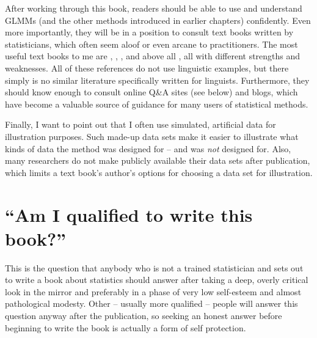 After working through this book, readers should be able to use and understand GLMMs (and the other methods introduced in earlier chapters) confidently.
Even more importantly, they will be in a position to consult text books written by statisticians, which often seem aloof or even arcane to practitioners.
The most useful text books to me are \cite{FahrmeirEa2013}, \cite{Fox2016}, \cite{ZuurEa2009}, and above all \cite{GelmanHill2006}, all with different strengths and weaknesses.
All of these references do not use linguistic examples, but there simply is no similar literature specifically written for linguists.
Furthermore, they should know enough to consult online Q\&A sites (see below) and blogs, which have become a valuable source of guidance for many users of statistical methods.

Finally, I want to point out that I often use simulated, artificial data for illustration purposes.
Such made-up data sets make it easier to illustrate what kinds of data the method was designed for -- and was \textit{not} designed for.
Also, many researchers do not make publicly available their data sets after publication, which limits a text book's author's options for choosing a data set for illustration.


\section*{``Am I qualified to write this book?''}

This is the question that anybody who is not a trained statistician and sets out to write a book about statistics should answer after taking a deep, overly critical look in the mirror and preferably in a phase of very low self-esteem and almost pathological modesty.
Other -- usually more qualified -- people will answer this question anyway after the publication, so seeking an honest answer before beginning to write the book is actually a form of self protection.

